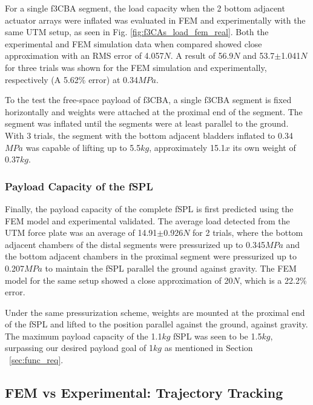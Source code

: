 \documentclass[letterpaper, 10 pt, conference]{ieeeconf}  %
\begin{document}
For a single f3CBA segment, the load capacity when the 2 bottom adjacent actuator arrays were inflated was evaluated in FEM and experimentally with the same UTM setup, as seen in Fig. \ref{fig:f3CAs_load_fem_real}. Both the experimental and FEM simulation data when compared showed close approximation with an RMS error of 4.057$N$. A result of 56.9$N$ and 53.7$\pm$1.041$N$ for three trials was shown for the FEM simulation and experimentally, respectively (A 5.62\% error) at 0.34$MPa$. 

To the test the free-space payload of f3CBA, a single f3CBA segment is fixed horizontally and weights were attached at the proximal end of the segment. The segment was inflated until the segments were at least parallel to the ground. With 3 trials, the segment with the bottom adjacent bladders inflated to 0.34$MPa$ was capable of lifting up to 5.5$kg$, approximately 15.1$x$ its own weight of 0.37$kg$.


\subsubsection{Payload Capacity of the fSPL}

Finally, the payload capacity of the complete fSPL is first predicted using the FEM model and experimental validated. The average load detected from the UTM force plate was an average of 14.91$\pm$0.926$N$ for 2 trials, where the bottom adjacent chambers of the distal segments were pressurized up to 0.345$MPa$ and the bottom adjacent chambers in the proximal segment were pressurized up to 0.207$MPa$ to maintain the fSPL parallel the ground against gravity. The FEM model for the same setup showed a close approximation of 20$N$, which is a 22.2\% error. 

Under the same pressurization scheme, weights are mounted at the proximal end of the fSPL and lifted to the position parallel against the ground, against gravity. The maximum payload capacity of the 1.1$kg$ fSPL was seen to be 1.5$kg$, surpassing our desired payload goal of 1$kg$ as mentioned in Section ~\ref{sec:func_req}.


\subsection{FEM vs Experimental: Trajectory Tracking}

\end{document}
